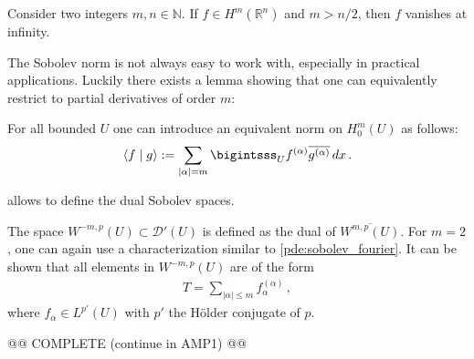     \begin{property}
        Consider two integers $m,n\in\mathbb{N}$. If $f\in H^m(\mathbb{R}^n)$ and $m>n/2$, then $f$ vanishes at infinity.
    \end{property}

    The Sobolev norm is not always easy to work with, especially in practical applications. Luckily there exists a lemma showing that one can equivalently restrict to partial derivatives of order $m$:
    \begin{theorem}[Friedrich]
        For all bounded $U$ one can introduce an equivalent norm on $H^m_0(U)$ as follows:
        \begin{gather}
            \langle f\mid g \rangle := \sum_{|\alpha|=m}\bigintsss_U f^{(\alpha)}\overline{g^{(\alpha)}}\,dx\,.
        \end{gather}
    \end{theorem}

     allows to define the dual Sobolev spaces.
    \begin{definition}
        The space $W^{-m,p}(U)\subset\mathcal{D}'(U)$ is defined as the dual of $\overline{W^{m,p}(U)}$. For $m=2$, one can again use a characterization similar to \cref{pde:sobolev_fourier}. It can be shown that all elements in $W^{-m,p}(U)$ are of the form
        \begin{gather}
            T = \sum_{|\alpha|\leq m}f^{(\alpha)}_\alpha\,,
        \end{gather}
        where $f_\alpha\in L^{p'}(U)$ with $p'$ the H\"older conjugate of $p$.
    \end{definition}

    @@ COMPLETE (continue in AMP1) @@